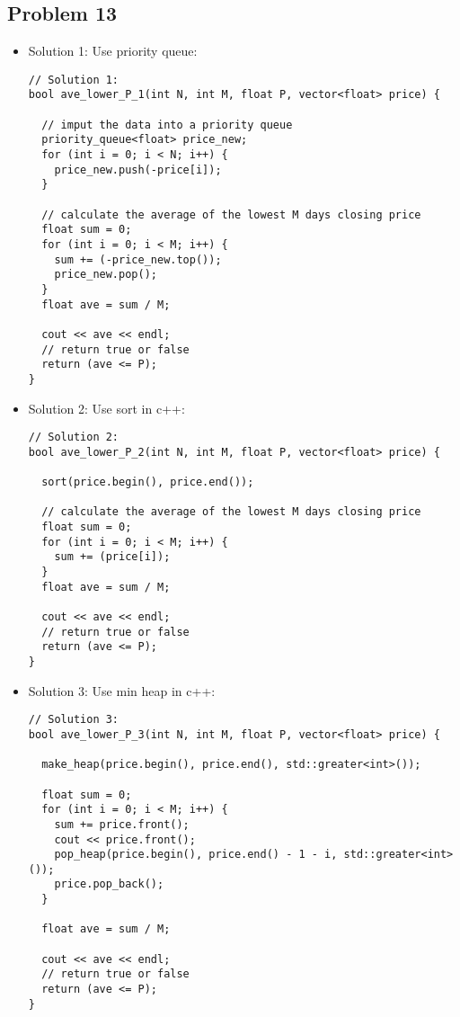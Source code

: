 \documentclass[11pt]{article}
\theoremstyle{remark}
\begin{document}
\subsection{Problem 13}
\begin{itemize}
\item Solution 1: Use priority queue:
\begin{lstlisting}
// Solution 1:
bool ave_lower_P_1(int N, int M, float P, vector<float> price) {

  // imput the data into a priority queue
  priority_queue<float> price_new;
  for (int i = 0; i < N; i++) {
    price_new.push(-price[i]);
  }

  // calculate the average of the lowest M days closing price
  float sum = 0;
  for (int i = 0; i < M; i++) {
    sum += (-price_new.top());
    price_new.pop();
  }
  float ave = sum / M;

  cout << ave << endl;
  // return true or false
  return (ave <= P); 
}
\end{lstlisting}
\item Solution 2: Use sort in c++:
\begin{lstlisting}
// Solution 2:
bool ave_lower_P_2(int N, int M, float P, vector<float> price) {

  sort(price.begin(), price.end());

  // calculate the average of the lowest M days closing price
  float sum = 0;
  for (int i = 0; i < M; i++) {
    sum += (price[i]);
  }
  float ave = sum / M;

  cout << ave << endl;
  // return true or false
  return (ave <= P);
}
\end{lstlisting}
\item Solution 3: Use min heap in c++:
\begin{lstlisting}
// Solution 3:
bool ave_lower_P_3(int N, int M, float P, vector<float> price) {

  make_heap(price.begin(), price.end(), std::greater<int>());

  float sum = 0;
  for (int i = 0; i < M; i++) {
    sum += price.front();
    cout << price.front();
    pop_heap(price.begin(), price.end() - 1 - i, std::greater<int>());
    price.pop_back();
  }

  float ave = sum / M;

  cout << ave << endl;
  // return true or false
  return (ave <= P);
}
\end{lstlisting}

\end{itemize}
\end{document}
